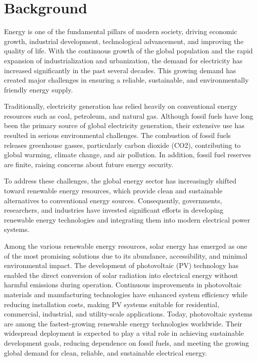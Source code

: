 

\section{Background}
Energy is one of the fundamental pillars of modern society, driving economic growth, industrial development, technological advancement, and improving the quality of life. With the continuous growth of the global population and the rapid expansion of industrialization and urbanization, the demand for electricity has increased significantly in the past several decades. This growing demand has created major challenges in ensuring a reliable, sustainable, and environmentally friendly energy supply.

Traditionally, electricity generation has relied heavily on conventional energy resources such as coal, petroleum, and natural gas. Although fossil fuels have long been the primary source of global electricity generation, their extensive use has resulted in serious environmental challenges. The combustion of fossil fuels releases greenhouse gasses, particularly carbon dioxide (CO2), contributing to global warming, climate change, and air pollution.
In addition, fossil fuel reserves are finite, raising concerns about future energy security.

To address these challenges, the global energy sector has increasingly shifted toward renewable energy resources, which provide clean and sustainable alternatives to conventional energy sources. Consequently, governments, researchers, and industries have invested significant efforts in developing renewable energy technologies and integrating them into
modern electrical power systems.

Among the various renewable energy resources, solar energy has emerged as one of the most promising solutions due to its abundance, accessibility, and minimal environmental impact. The development of photovoltaic (PV) technology has enabled the direct conversion of solar radiation into electrical energy without harmful emissions during operation.
Continuous improvements in photovoltaic materials and manufacturing technologies have enhanced system efficiency while reducing installation costs, making PV systems suitable for residential, commercial, industrial, and utility-scale applications. Today, photovoltaic systems are among the fastest-growing renewable energy technologies worldwide. Their widespread deployment is expected to play a vital role in achieving sustainable development goals, reducing dependence on fossil fuels, and meeting
the growing global demand for clean, reliable, and sustainable electrical energy\cite{masters2013}.

